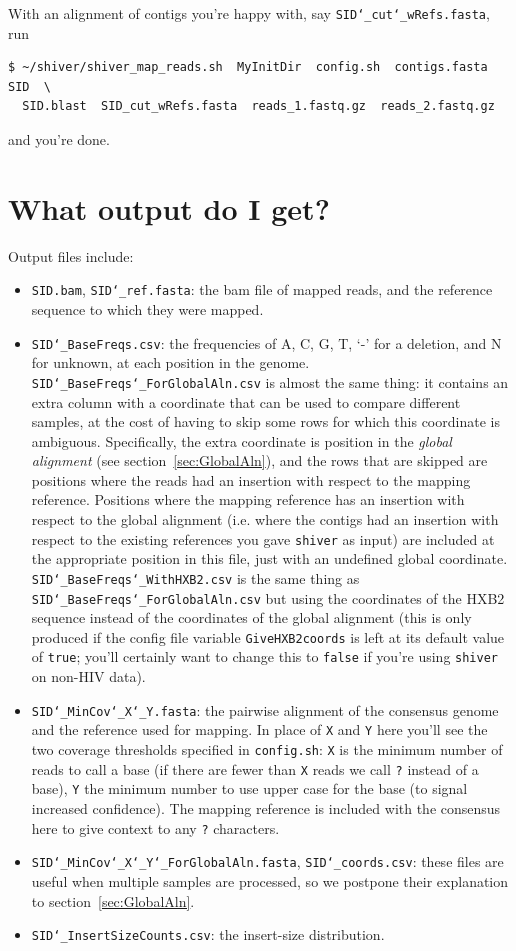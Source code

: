 \documentclass{article}
\newcommand{\shiv}{\c{shiver}\xspace}
\let\c\texttt
\begin{document}
With an alignment of contigs you're happy with, say \c{SID\char`_cut\char`_wRefs.fasta}, run
\begin{Verbatim}[samepage=true]
$ ~/shiver/shiver_map_reads.sh  MyInitDir  config.sh  contigs.fasta  SID  \
  SID.blast  SID_cut_wRefs.fasta  reads_1.fastq.gz  reads_2.fastq.gz
\end{Verbatim}
and you're done.

\section{What output do I get?}

Output files include:
\begin{itemize}
\item \c{SID.bam}, \c{SID\char`_ref.fasta}: the bam file of mapped reads, and the reference sequence to which they were mapped.
\item \c{SID\char`_BaseFreqs.csv}: the frequencies of A, C, G, T, `-' for a deletion, and N for unknown, at each position in the genome.
\c{SID\char`_BaseFreqs\char`_ForGlobalAln.csv} is almost the same thing: it contains an extra column with a coordinate that can be used to compare different samples, at the cost of having to skip some rows for which this coordinate is ambiguous.
Specifically, the extra coordinate is position in the {\it global alignment} (see section~\ref{sec:GlobalAln}), and the rows that are skipped are positions where the reads had an insertion with respect to the mapping reference.
Positions where the mapping reference has an insertion with respect to the global alignment (i.e. where the contigs had an insertion with respect to the existing references you gave \shiv as input) are included at the appropriate position in this file, just with an undefined global coordinate.
\c{SID\char`_BaseFreqs\char`_WithHXB2.csv} is the same thing as \c{SID\char`_BaseFreqs\char`_ForGlobalAln.csv} but using the coordinates of the HXB2 sequence instead of the coordinates of the global alignment (this is only produced if the config file variable \c{GiveHXB2coords} is left at its default value of \c{true}; you'll certainly want to change this to \c{false} if you're using \shiv on non-HIV data).
\item \c{SID\char`_MinCov\char`_X\char`_Y.fasta}: the pairwise alignment of the consensus genome and the reference used for mapping.
In place of \c{X} and \c{Y} here you'll see the two coverage thresholds specified in \c{config.sh}: \c{X} is the minimum number of reads to call a base (if there are fewer than \c{X} reads we call \c{?} instead of a base), \c{Y} the minimum number to use upper case for the base (to signal increased confidence).
The mapping reference is included with the consensus here to give context to any \c{?} characters.
\item \c{SID\char`_MinCov\char`_X\char`_Y\char`_ForGlobalAln.fasta}, \c{SID\char`_coords.csv}: these files are useful when multiple samples are processed, so we postpone their explanation to section~\ref{sec:GlobalAln}.  
\item \c{SID\char`_InsertSizeCounts.csv}: the insert-size distribution.
\end{itemize}
\end{document}
